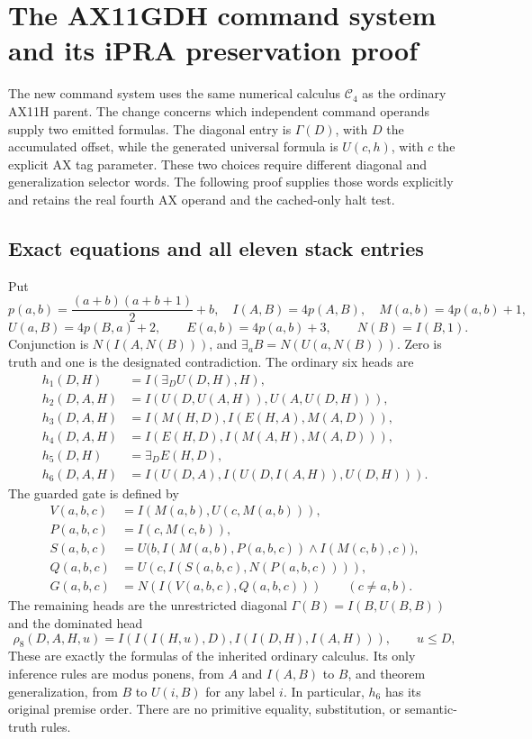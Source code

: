 \section{The AX11GDH command system and its iPRA preservation proof}
\label{sec:ax11gdh-preservation}

The new command system uses the same numerical calculus $\mathcal C_4$
as the ordinary AX11H parent. The change concerns which independent
command operands supply two emitted formulas. The diagonal entry is
$\Gamma(D)$, with $D$ the accumulated offset, while the generated
universal formula is $U(c,h)$, with $c$ the explicit AX tag parameter.
These two choices require different diagonal and generalization selector
words. The following proof supplies those words explicitly and retains
the real fourth AX operand and the cached-only halt test.

\subsection{Exact equations and all eleven stack entries}

Put
\[
 p(a,b)=\frac{(a+b)(a+b+1)}2+b,\quad
 I(A,B)=4p(A,B),\quad M(a,b)=4p(a,b)+1,
\]
\[
 U(a,B)=4p(B,a)+2,\qquad E(a,b)=4p(a,b)+3,
 \qquad N(B)=I(B,1).
\]
Conjunction is $N(I(A,N(B)))$, and
$\exists_a B=N(U(a,N(B)))$. Zero is truth and one is the designated
contradiction. The ordinary six heads are
\begin{align*}
 h_1(D,H)&=I(\exists_D U(D,H),H),\\
 h_2(D,A,H)&=I(U(D,U(A,H)),U(A,U(D,H))),\\
 h_3(D,A,H)&=I(M(H,D),I(E(H,A),M(A,D))),\\
 h_4(D,A,H)&=I(E(H,D),I(M(A,H),M(A,D))),\\
 h_5(D,H)&=\exists_D E(H,D),\\
 h_6(D,A,H)&=I(U(D,A),I(U(D,I(A,H)),U(D,H))).
\end{align*}
The guarded gate is defined by
\begin{align*}
 V(a,b,c)&=I(M(a,b),U(c,M(a,b))),\\
 P(a,b,c)&=I(c,M(c,b)),\\
 S(a,b,c)&=U\bigl(b,I(M(a,b),P(a,b,c))
                          \wedge I(M(c,b),c)\bigr),\\
 Q(a,b,c)&=U(c,I(S(a,b,c),N(P(a,b,c)))),\\
 G(a,b,c)&=N(I(V(a,b,c),Q(a,b,c)))\qquad(c\ne a,b).
\end{align*}
The remaining heads are the unrestricted diagonal
$\Gamma(B)=I(B,U(B,B))$ and the dominated head
\[
 \rho_8(D,A,H,u)=I(I(I(H,u),D),I(I(D,H),I(A,H))),\qquad u\le D,
\]
These are exactly the formulas of the inherited ordinary calculus.
Its only inference rules are modus ponens, from $A$ and $I(A,B)$ to $B$,
and theorem generalization, from $B$ to $U(i,B)$ for any label $i$.
In particular, $h_6$ has its original premise order. There are no
primitive equality, substitution, or semantic-truth rules.


